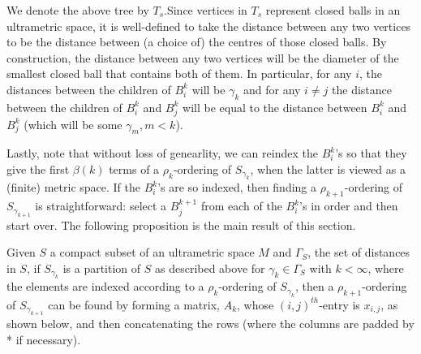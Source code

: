 \begin{center}
\end{center}


We denote the above tree by $T_s$.Since vertices in $T_s$ represent closed balls in an ultrametric space, it is well-defined to take the distance between any two vertices to be the distance between (a choice of) the centres of those closed balls. By construction, the distance between any two vertices will be the diameter of the smallest closed ball that contains both of them.  In particular, for any $i$, the distances between the children of $B^k_i$ will be $\gamma_k$ and for any $i \neq j$ the distance between the children of $B^k_i$ and $B^k_j$ will be equal to the distance between  $B^k_i$ and $B^k_j$ (which will be some $\gamma_{m}, m <k$). 


Lastly, note that without loss of genearlity, we can reindex the $B^k_i$'s so that they give the first $\beta(k)$ terms of a $\rho_k$-ordering of $S_{\gamma_k}$, when the latter is viewed as a (finite) metric space. If the $B^k_i$'s are so indexed, then finding a $\rho_{k+1}$-ordering of $S_{\gamma_{k+1}}$ is straightforward: select a $B^{k+1}_j$ from each of the $B^k_i$'s in order and then start over.  The following proposition is the main result of this section.

\begin{proposition*}
Given $S$ a compact subset of an ultrametric space $M$ and $\Gamma_S$, the set of distances in $S$, if $S_{\gamma_k}$ is a partition of $S$ as described above for $\gamma_k \in \Gamma_S$ with $k < \infty$, where the elements are indexed according to a $\rho_k$-ordering of $S_{\gamma_k}$, then a $\rho_{k+1}$-ordering of $S_{\gamma_{k+1}}$ can be found by forming a matrix, $A_k$, whose $(i,j)^{th}$-entry is $x_{i,j}$, as shown below, and then concatenating the rows (where the columns are padded by * if necessary). 
\end{proposition*}

